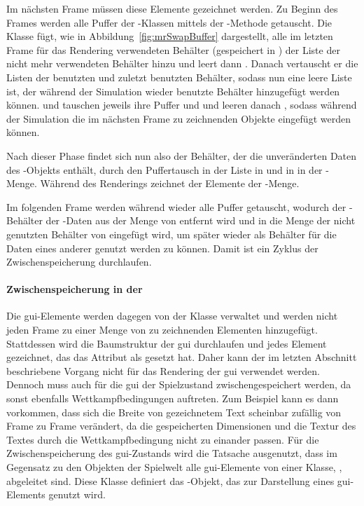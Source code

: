 Im nächsten Frame müssen diese Elemente gezeichnet werden. Zu Beginn des Frames werden alle Puffer der -Klassen mittels der -Methode getauscht. Die Klasse  fügt, wie in Abbildung~\vref{fig:mrSwapBuffer} dargestellt, alle im letzten Frame für das Rendering verwendeten Behälter (gespeichert in ) der Liste der nicht mehr verwendeten Behälter hinzu und leert dann . Danach vertauscht er die Listen der benutzten und zuletzt benutzten Behälter, sodass  nun eine leere Liste ist, der während der Simulation wieder benutzte Behälter hinzugefügt werden können.  und  tauschen jeweils ihre Puffer  und  und leeren danach , sodass während der Simulation die im nächsten Frame zu zeichnenden Objekte eingefügt werden können.

Nach dieser Phase findet sich nun also der Behälter, der die unveränderten Daten des -Objekts enthält, durch den Puffertausch in der Liste  in  und in  in der -Menge. Während des Renderings zeichnet der  Elemente der -Menge.

Im folgenden Frame werden während  wieder alle Puffer getauscht, wodurch der -Behälter der -Daten aus der Menge von  entfernt wird und in die Menge der nicht genutzten Behälter von  eingefügt wird, um später wieder als Behälter für die Daten eines anderer  genutzt werden zu können. Damit ist ein Zyklus der Zwischenspeicherung durchlaufen. 

\paragraph{Zwischenspeicherung in der }
Die \ac{gui}-Elemente werden dagegen von der Klasse  verwaltet und werden nicht jeden Frame zu einer Menge von zu zeichnenden Elementen hinzugefügt. 
Stattdessen wird die Baumstruktur der \ac{gui} durchlaufen und jedes Element gezeichnet, das das Attribut  als  gesetzt hat. Daher kann der im letzten Abschnitt beschriebene Vorgang nicht für das Rendering der \ac{gui} verwendet werden. Dennoch muss auch für die \ac{gui} der Spielzustand zwischengespeichert werden, da sonst ebenfalls Wettkampfbedingungen auftreten. Zum Beispiel kann es dann vorkommen, dass sich die Breite von gezeichnetem Text scheinbar zufällig von Frame zu Frame verändert, da die gespeicherten Dimensionen und die Textur des Textes durch die Wettkampfbedingung nicht zu einander passen. Für die Zwischenspeicherung des \ac{gui}-Zustands wird die Tatsache ausgenutzt, dass im Gegensatz zu den Objekten der Spielwelt alle \ac{gui}-Elemente von einer Klasse, , abgeleitet sind. Diese Klasse definiert das -Objekt, das zur Darstellung eines \ac{gui}-Elements genutzt wird. 

